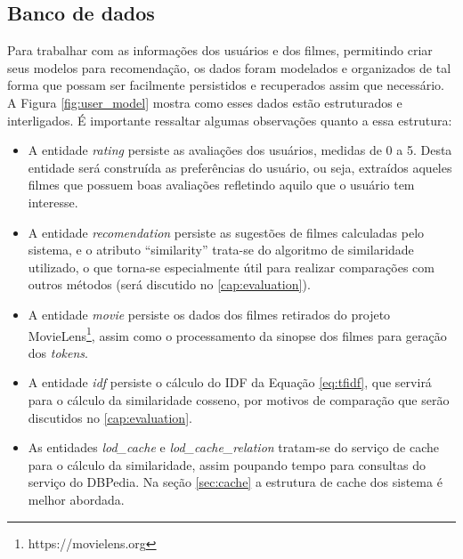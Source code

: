 \subsection{Banco de dados}

Para trabalhar com as informações dos usuários e dos filmes, permitindo criar seus modelos para recomendação, os dados foram modelados e organizados de tal forma que possam ser facilmente persistidos e recuperados assim que necessário. A Figura \ref{fig:user_model} mostra como esses dados estão estruturados e interligados. É importante ressaltar algumas observações quanto a essa estrutura:

\begin{itemize}
	\item{A entidade \textit{rating} persiste as avaliações dos usuários, medidas de 0 a 5. Desta entidade será construída as preferências do usuário, ou seja, extraídos aqueles filmes que possuem boas avaliações refletindo aquilo que o usuário tem interesse.}
	
	\item{A entidade \textit{recomendation} persiste as sugestões de filmes calculadas pelo sistema, e o atributo \enquote{similarity} trata-se do algoritmo de similaridade utilizado, o que torna-se especialmente útil para realizar comparações com outros métodos (será discutido no \ref{cap:evaluation}).}
	
	\item{A entidade \textit{movie} persiste os dados dos filmes retirados do projeto MovieLens\footnote{https://movielens.org}, assim como o processamento da sinopse dos filmes para geração dos \textit{tokens}.}
	
	\item{A entidade \textit{idf} persiste o cálculo do \ac{IDF} da Equação \ref{eq:tfidf}, que servirá para o cálculo da similaridade cosseno, por motivos de comparação que serão discutidos no \ref{cap:evaluation}.}
	
	\item{As entidades \textit{lod\_cache} e \textit{lod\_cache\_relation} tratam-se do serviço de cache para o cálculo da similaridade, assim poupando tempo para consultas do serviço do DBPedia. Na seção \ref{sec:cache} a estrutura de cache dos sistema é melhor abordada.}
\end{itemize}

